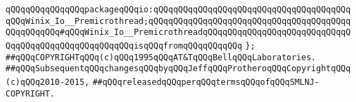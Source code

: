 \verb|qQQqqQQqqQQqqQQqpackageqQQqio:qQQqqQQqqQQqqQQqqQQqqQQqqQQqqQQqqQQqqQQqqQQqWinix_Io__Premicrothread;qQQqqQQqqQQqqQQqqQQqqQQqqQQqqQQqqQQqqQQqqQQqqQQqqQQq#qQQqWinix_Io__PremicrothreadqQQqqQQqqQQqqQQqqQQqqQQqqQQqqQQqqQQqqQQqqQQqqQQqqQQqqQQqisqQQqfromqQQqqQQqqQQq|\newline
\verb|};|\newline
\newline
\newline
\newline
\newline
\verb|##qQQqCOPYRIGHTqQQq(c)qQQq1995qQQqAT&TqQQqBellqQQqLaboratories.|\newline
\verb|##qQQqSubsequentqQQqchangesqQQqbyqQQqJeffqQQqProtheroqQQqCopyrightqQQq(c)qQQq2010-2015,|\newline
\verb|##qQQqreleasedqQQqperqQQqtermsqQQqofqQQqSMLNJ-COPYRIGHT.|\newline

